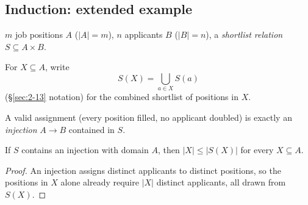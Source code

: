 \subsection{Induction: extended example}
\label{sec:3-12}

\begin{note}[Setup]
$m$ job positions $A$ ($|A|=m$), $n$ applicants $B$ ($|B|=n$), a \emph{shortlist relation} $S \subseteq A\times B$.

For $X \subseteq A$, write
\[
S(X) = \bigcup_{a\in X} S(a)
\]
(\S\ref{sec:2-13} notation) for the combined shortlist of positions in $X$.

A valid assignment (every position filled, no applicant doubled) is exactly an \emph{injection} $A \to B$ contained in $S$.
\end{note}

\bigskip
\begin{theorem}
If $S$ contains an injection with domain $A$, then $|X| \le |S(X)|$ for every $X \subseteq A$.
\end{theorem}
\begin{proof}
An injection assigns distinct applicants to distinct positions, so the positions in $X$ alone already require $|X|$ distinct applicants, all drawn from $S(X)$.
\end{proof}


